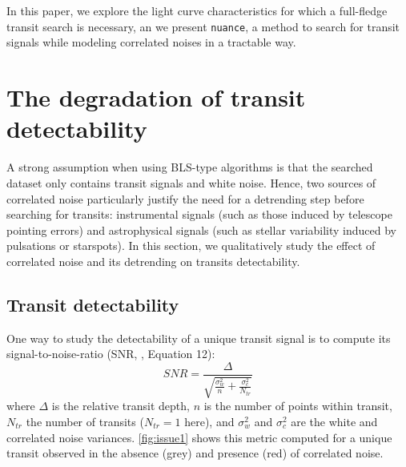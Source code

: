 \documentclass{aastex631}
\newcommand{\nuance}{\texttt{nuance}}
\begin{document}
\\\\
In this paper, we explore the light curve characteristics for which a full-fledge transit search is necessary, an we present \nuance{}, a method to search for transit signals while modeling correlated noises in a tractable way. 

\section{The degradation of transit detectability}\label{issues}

A strong assumption when using BLS-type algorithms is that the searched dataset only contains transit signals and white noise. Hence, two sources of correlated noise particularly justify the need for a detrending step before searching for transits: instrumental signals (such as those induced by telescope pointing errors) and astrophysical signals (such as stellar variability induced by pulsations or starspots). In this section, we qualitatively study the effect of correlated noise and its detrending on transits detectability.

\subsection{Transit detectability}

One way to study the detectability of a unique transit signal is to compute its signal-to-noise-ratio (SNR, \citealt{Pont2006}, Equation 12):
\begin{equation}\label{eq:snr}
  SNR= \frac{\Delta}{\sqrt{\frac{\sigma_w^2}{n} + \frac{\sigma_c^2}{N_{tr}}}}
\end{equation}
where $\Delta$ is the relative transit depth, $n$ is the number of points within transit, $N_{tr}$ the number of transits ($N_{tr}=1$ here), and $\sigma_w^2$ and $\sigma_c^2$ are the white and correlated noise variances. \autoref{fig:issue1} shows this metric computed for a unique transit observed in the absence (grey) and presence (red) of correlated noise.
\end{document}
